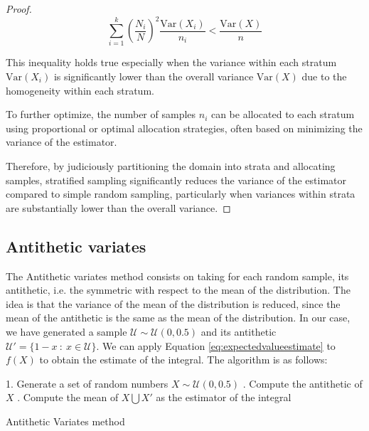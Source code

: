 \documentclass{report}
\begin{document}
\begin{proof}
	\[ \sum_{i=1}^{k} \left( \frac{N_i}{N} \right)^2 \frac{\mathrm{Var}(X_i)}{n_i} < \frac{\mathrm{Var}(X)}{n} \]
	   
	This inequality holds true especially when the variance within each stratum \( \mathrm{Var}(X_i) \) is significantly lower than the overall variance \( \mathrm{Var}(X) \) due to the homogeneity within each stratum.
	   
	To further optimize, the number of samples \( n_i \) can be allocated to each stratum using proportional or optimal allocation strategies, often based on minimizing the variance of the estimator.
	   
	Therefore, by judiciously partitioning the domain into strata and allocating samples, stratified sampling significantly reduces the variance of the estimator compared to simple random sampling, particularly when variances within strata are substantially lower than the overall variance.

\end{proof}


\subsection{Antithetic variates}
\label{sec:antithetic_variates}

The Antithetic variates method consists on taking for each random sample, its antithetic, i.e. the symmetric with respect to the mean of the distribution. The idea is that the variance of the mean of the distribution is reduced, since the mean of the antithetic is the same as the mean of the distribution. In our case, we have generated a sample \(\mathcal{U} \sim \mathcal{U}(0,0.5)\) and its antithetic \(\mathcal{U}' = \{1 - x \ : \ x \in \mathcal{U}\}\). We can apply Equation \eqref{eq:expectedvalueestimate} to \(f(X)\) to obtain the estimate of the integral. The algorithm is as follows:

\begin{center}
	\begin{minipage}{0.7\linewidth} %
		\begin{algorithm}[H]
			1. Generate a set of random numbers \(X \sim \mathcal{U}(0,0.5)\) . Compute the antithetic of \(X\) . Compute the mean of \(X \bigcup X'\) as the estimator of the integral \;
			\caption{Antithetic Variates method} %
			\label{alg:antitheticvariates}   %
		\end{algorithm}
	\end{minipage}
\end{center}
\end{document}
